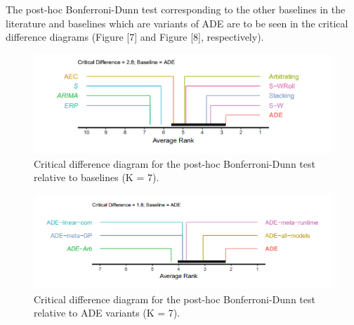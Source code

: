 \documentclass[runningheads,a4paper]{llncs}[2015/06/24]
\begin{document}
\hspace{1cm}\\\\ The post-hoc Bonferroni-Dunn test corresponding to the other baselines in the literature and baselines which are variants of ADE are to be seen in the critical difference diagrams (Figure [7] and Figure [8], respectively).

\begin{figure}[h]
\centering
\includegraphics[width=\textwidth]{criticalDifference1}
\caption{Critical difference diagram for the post-hoc Bonferroni-Dunn test relative to baselines (K = 7).}
\label{fig:critical difference diag.1}
\end{figure}

\begin{figure}[h]
\centering
\includegraphics[width=\textwidth]{criticalDifference2}
\caption{Critical difference diagram for the post-hoc Bonferroni-Dunn test relative to ADE variants (K = 7).}
\label{fig:critical difference diag.2}
\end{figure}
\end{document}
